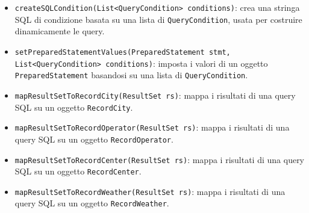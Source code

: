 \begin{itemize}
      \item \texttt{createSQLCondition(List<QueryCondition> conditions)}: crea una stringa SQL di condizione basata su una lista di \texttt{QueryCondition}, usata per costruire dinamicamente le query.
      \item \texttt{setPreparedStatementValues(PreparedStatement stmt, List<QueryCondition> conditions)}: imposta i valori di un oggetto \texttt{PreparedStatement} basandosi su una lista di \texttt{QueryCondition}.
      \item \texttt{mapResultSetToRecordCity(ResultSet rs)}: mappa i risultati di una query SQL su un oggetto \texttt{RecordCity}.
      \item \texttt{mapResultSetToRecordOperator(ResultSet rs)}: mappa i risultati di una query SQL su un oggetto \texttt{RecordOperator}.
      \item \texttt{mapResultSetToRecordCenter(ResultSet rs)}: mappa i risultati di una query SQL su un oggetto \texttt{RecordCenter}.
      \item \texttt{mapResultSetToRecordWeather(ResultSet rs)}: mappa i risultati di una query SQL su un oggetto \texttt{RecordWeather}.
\end{itemize}


